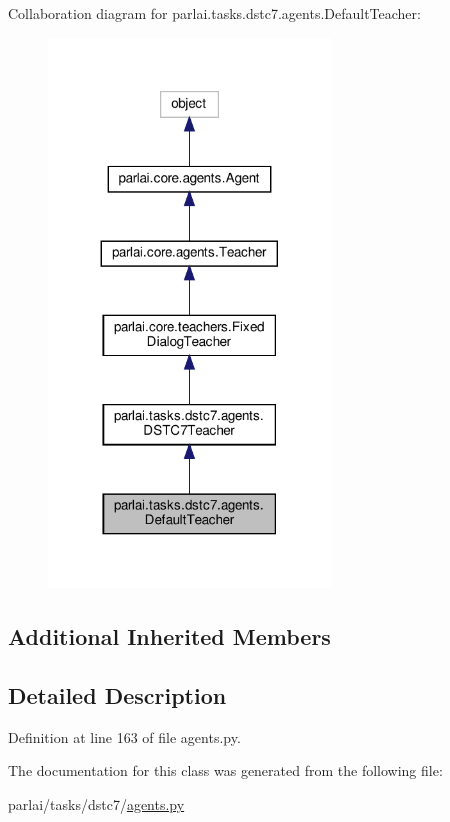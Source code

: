 Collaboration diagram for parlai.\+tasks.\+dstc7.\+agents.\+Default\+Teacher\+:\nopagebreak
\begin{figure}[H]
\begin{center}
\leavevmode
\includegraphics[width=212pt]{df/d4f/classparlai_1_1tasks_1_1dstc7_1_1agents_1_1DefaultTeacher__coll__graph}
\end{center}
\end{figure}
\subsection*{Additional Inherited Members}


\subsection{Detailed Description}


Definition at line 163 of file agents.\+py.



The documentation for this class was generated from the following file\+:\begin{DoxyCompactItemize}
\item 
parlai/tasks/dstc7/\hyperlink{parlai_2tasks_2dstc7_2agents_8py}{agents.\+py}\end{DoxyCompactItemize}
